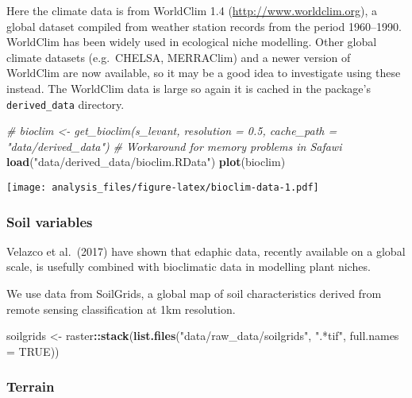 \documentclass[]{article}
\newenvironment{Shaded}{\begin{snugshade}}{\end{snugshade}}
\newcommand{\CommentTok}[1]{\textcolor[rgb]{0.56,0.35,0.01}{\textit{#1}}}
\newcommand{\DataTypeTok}[1]{\textcolor[rgb]{0.13,0.29,0.53}{#1}}
\newcommand{\KeywordTok}[1]{\textcolor[rgb]{0.13,0.29,0.53}{\textbf{#1}}}
\newcommand{\NormalTok}[1]{#1}
\newcommand{\OperatorTok}[1]{\textcolor[rgb]{0.81,0.36,0.00}{\textbf{#1}}}
\newcommand{\OtherTok}[1]{\textcolor[rgb]{0.56,0.35,0.01}{#1}}
\newcommand{\StringTok}[1]{\textcolor[rgb]{0.31,0.60,0.02}{#1}}
\begin{document}
Here the climate data is from WorldClim 1.4
(\url{http://www.worldclim.org}), a global dataset compiled from weather
station records from the period 1960--1990. WorldClim has been widely
used in ecological niche modelling. Other global climate datasets
(e.g.~CHELSA, MERRAClim) and a newer version of WorldClim are now
available, so it may be a good idea to investigate using these instead.
The WorldClim data is large so again it is cached in the package's
\texttt{derived\_data} directory.

\begin{Shaded}
\begin{Highlighting}[]
\CommentTok{# bioclim <- get_bioclim(s_levant, resolution = 0.5, cache_path = "data/derived_data")}
\CommentTok{# Workaround for memory problems in Safawi}
\KeywordTok{load}\NormalTok{(}\StringTok{"data/derived_data/bioclim.RData"}\NormalTok{)}
\KeywordTok{plot}\NormalTok{(bioclim)}
\end{Highlighting}
\end{Shaded}

\texttt{[image: analysis\_files/figure-latex/bioclim-data-1.pdf]}

\hypertarget{soil-variables}{%
\subsubsection{Soil variables}\label{soil-variables}}

Velazco et al.~(2017) have shown that edaphic data, recently available
on a global scale, is usefully combined with bioclimatic data in
modelling plant niches.

We use data from SoilGrids, a global map of soil characteristics derived
from remote sensing classification at 1km resolution.

\begin{Shaded}
\begin{Highlighting}[]
\NormalTok{soilgrids <-}\StringTok{ }\NormalTok{raster}\OperatorTok{::}\KeywordTok{stack}\NormalTok{(}\KeywordTok{list.files}\NormalTok{(}\StringTok{"data/raw_data/soilgrids"}\NormalTok{, }\StringTok{".*tif"}\NormalTok{, }\DataTypeTok{full.names =} \OtherTok{TRUE}\NormalTok{))}
\end{Highlighting}
\end{Shaded}

\hypertarget{terrain}{%
\subsubsection{Terrain}\label{terrain}}
\end{document}
